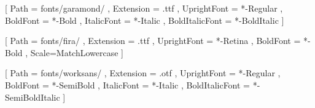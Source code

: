
\lstset{
    language = Python,
    breaklines=true,
    escapeinside=||
}






\newsavebox{\marginfloatbox}
\newenvironment{marginfloat}[2][-1.2ex]%
  {\FloatBarrier%
  \begin{lrbox}{\marginfloatbox}%
  \begin{minipage}{\marginparwidth}%
    \def\@captype{#2}%
    \hbox{}\vspace*{#1}%
    \renewcommand{\baselinestretch}{1}
    \noindent%
  }
  {\end{minipage}%
  \end{lrbox}%
  \marginpar{\usebox{\marginfloatbox}}%
  \renewcommand{\baselinestretch}{1.5}%
  }

\captionsetup[lstfloat]{skip=0pt}

\lstset{aboveskip=0pt,belowskip=0pt}




\setmainfont{EBGaramond}[
	Path = fonts/garamond/ ,
	Extension = .ttf ,
	UprightFont = *-Regular ,
	BoldFont = *-Bold ,
	ItalicFont = *-Italic ,
	BoldItalicFont = *-BoldItalic
]

\setmonofont{FiraCode}[
  Path = fonts/fira/ ,
  Extension = .ttf ,
  UprightFont = *-Retina ,
  BoldFont = *-Bold ,
  Scale=MatchLowercase
]

\setsansfont{WorkSans}[
  Path = fonts/worksans/ ,
  Extension = .otf ,
  UprightFont = *-Regular ,
  BoldFont = *-SemiBold ,
  ItalicFont = *-Italic ,
  BoldItalicFont = *-SemiBoldItalic
]

\newcommand{\changelocaltocdepth}[1]{%
  \addtocontents{toc}{\protect\setcounter{tocdepth}{#1}}%
  \setcounter{tocdepth}{#1}%
}



